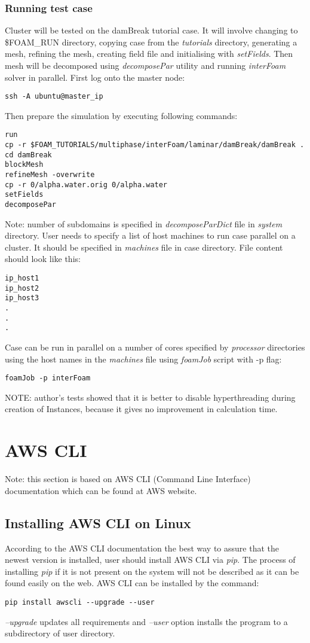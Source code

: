 \documentclass[12pt,english]{article}
\begin{document}
\subsubsection{Running test case}
Cluster will be tested on the damBreak tutorial case. It will involve changing to \$FOAM\_RUN directory, copying case from the \textit{tutorials} directory, generating a mesh, refining the mesh, creating field file and initialising with \textit{setFields}. Then mesh will be decomposed using \textit{decomposePar} utility and running \textit{interFoam} solver in parallel.
First log onto the master node:
\begin{lstlisting}
ssh -A ubuntu@master_ip
\end{lstlisting}
Then prepare the simulation by executing following commands:
\begin{lstlisting}
run
cp -r $FOAM_TUTORIALS/multiphase/interFoam/laminar/damBreak/damBreak .
cd damBreak
blockMesh
refineMesh -overwrite
cp -r 0/alpha.water.orig 0/alpha.water
setFields
decomposePar
\end{lstlisting}
Note: number of subdomains is specified in \textit{decomposeParDict} file in \textit{system} directory.
User needs to specify a list of host machines to run case parallel on a cluster. It should be specified in \textit{machines} file in case directory. File content should look like this:
\begin{lstlisting}
ip_host1
ip_host2
ip_host3
.
.
.
\end{lstlisting}
Case can be run in parallel on a number of cores specified by \textit{processor} directories using the host names in the \textit{machines} file using \textit{foamJob} script with -p flag:
\begin{lstlisting}
foamJob -p interFoam
\end{lstlisting}

NOTE: author's tests showed that it is  better to disable hyperthreading during creation of Instances, because it gives no improvement in calculation time.

\section{AWS CLI}
Note: this section is based on AWS CLI (Command Line Interface) documentation which can be found at AWS website.
\subsection{\label{Install AWS CLI}Installing AWS CLI on Linux}
According to the AWS CLI documentation the best way to assure that the newest version is installed, user should install AWS CLI via \textit{pip}. The process of installing \textit{pip} if it is not present on the system will not be described as it can be found easily on the web.
AWS CLI can be installed by the command:
\begin{lstlisting}	
pip install awscli --upgrade --user
\end{lstlisting}
\textit{--upgrade} updates all requirements and \textit{--user} option installs the program to a subdirectory of user directory.
\end{document}
